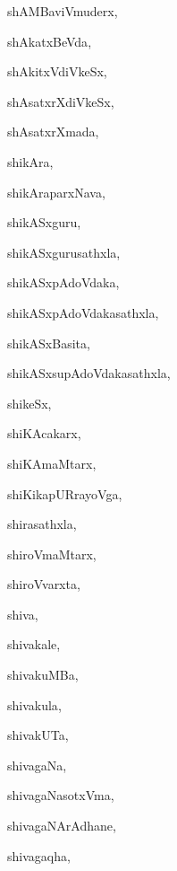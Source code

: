 \begin{multicols}{3}
{\noindent
{shAMBaviVmuderx}, \pageref{shAMBaviVmuderx}

\noindent
{shAkatxBeVda}, \pageref{shAkatxBeVda}

\noindent
{shAkitxVdiVkeSx}, \pageref{shAkitxVdiVkeSx}

\noindent
{shAsatxrXdiVkeSx}, \pageref{shAsatxrXdiVkeSx}

\noindent
{shAsatxrXmada}, \pageref{shAsatxrXmada}

\noindent
{shikAra}, \pageref{shikAra}

\noindent
{shikAraparxNava}, \pageref{shikAraparxNava}

\noindent
{shikASxguru}, \pageref{shikASxguru}

\noindent
{shikASxgurusathxla}, \pageref{shikASxgurusathxla}

\noindent
{shikASxpAdoVdaka}, \pageref{shikASxpAdoVdaka}

\noindent
{shikASxpAdoVdakasathxla}, \pageref{shikASxpAdoVdakasathxla}

\noindent
{shikASxBasita}, \pageref{shikASxBasita}

\noindent
{shikASxsupAdoVdakasathxla}, \pageref{shikASxsupAdoVdakasathxla}

\noindent
{shikeSx}, \pageref{shikeSx}

\noindent
{shiKAcakarx}, \pageref{shiKAcakarx}

\noindent
{shiKAmaMtarx}, \pageref{shiKAmaMtarx}

\noindent
{shiKikapURrayoVga}, \pageref{shiKikapURrayoVga}

\noindent
{shirasathxla}, \pageref{shirasathxla}

\noindent
{shiroVmaMtarx}, \pageref{shiroVmaMtarx}

\noindent
{shiroVvarxta}, \pageref{shiroVvarxta}

\noindent
{shiva}, \pageref{shiva}

\noindent
{shivakale}, \pageref{shivakale}

\noindent
{shivakuMBa}, \pageref{shivakuMBa}

\noindent
{shivakula}, \pageref{shivakula}

\noindent
{shivakUTa}, \pageref{shivakUTa}

\noindent
{shivagaNa}, \pageref{shivagaNa}

\noindent
{shivagaNasotxVma}, \pageref{shivagaNasotxVma}

\noindent
{shivagaNArAdhane}, \pageref{shivagaNArAdhane}

\noindent
{shivagaqha}, \pageref{shivagaqha}

}
\end{multicols}
